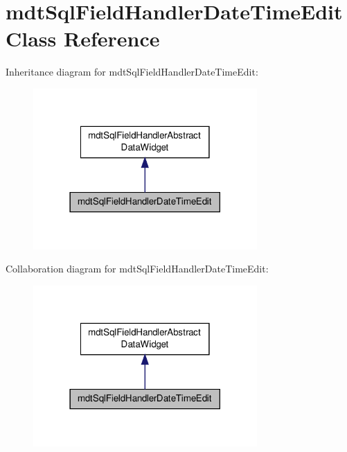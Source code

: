 \hypertarget{classmdt_sql_field_handler_date_time_edit}{\section{mdt\-Sql\-Field\-Handler\-Date\-Time\-Edit Class Reference}
\label{classmdt_sql_field_handler_date_time_edit}
}


Inheritance diagram for mdt\-Sql\-Field\-Handler\-Date\-Time\-Edit\-:\nopagebreak
\begin{figure}[H]
\begin{center}
\leavevmode
\includegraphics[width=242pt]{classmdt_sql_field_handler_date_time_edit__inherit__graph}
\end{center}
\end{figure}


Collaboration diagram for mdt\-Sql\-Field\-Handler\-Date\-Time\-Edit\-:\nopagebreak
\begin{figure}[H]
\begin{center}
\leavevmode
\includegraphics[width=242pt]{classmdt_sql_field_handler_date_time_edit__coll__graph}
\end{center}
\end{figure}
